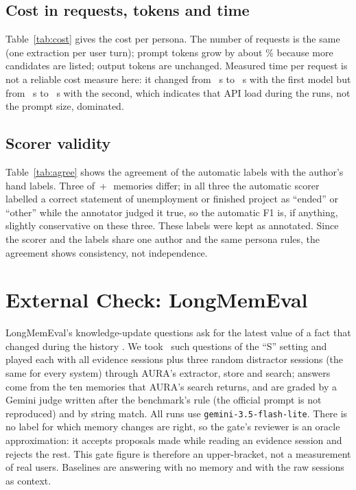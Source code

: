 \IfFileExists{IEEEtran.cls}{\documentclass[journal]{IEEEtran}\def\HAVEIEEE{1}}{\documentclass[10pt,twocolumn]{article}\usepackage[margin=0.7in,columnsep=0.25in]{geometry}}
\newcommand{\aura}{AURA}
\begin{document}
\subsection{Cost in requests, tokens and time}
Table~\ref{tab:cost} gives the cost per persona. The number of requests is the same (one extraction per user turn); prompt tokens grow by about \tokInc\% because more candidates are listed; output tokens are unchanged. Measured time per request is not a reliable cost measure here: it changed from \latBaseA\ s to \latBothA\ s with the first model but from \latBaseB\ s to \latBothB\ s with the second, which indicates that API load during the runs, not the prompt size, dominated.

\begin{table}[t]
\centering\small
\caption{Cost per persona (gate policy; means over 12 personas).}
\label{tab:cost}
\end{table}

\subsection{Scorer validity}
Table~\ref{tab:agree} shows the agreement of the automatic labels with the author's hand labels. Three of \agrBaseN\,+\,\agrBothN\ memories differ; in all three the automatic scorer labelled a correct statement of unemployment or finished project as ``ended'' or ``other'' while the annotator judged it true, so the automatic F1 is, if anything, slightly conservative on these three. These labels were kept as annotated. Since the scorer and the labels share one author and the same persona rules, the agreement shows consistency, not independence.

\begin{table}[t]
\centering\small
\caption{Agreement between automatic and hand labels (single annotator).}
\label{tab:agree}
\end{table}

\section{External Check: LongMemEval}
\label{sec:lme}
LongMemEval's knowledge-update questions ask for the latest value of a fact that changed during the history \cite{wu2024longmemeval}. We took \lmeQ\ such questions of the ``S'' setting and played each with all evidence sessions plus three random distractor sessions (the same for every system) through \aura's extractor, store and search; answers come from the ten memories that \aura's search returns, and are graded by a Gemini judge written after the benchmark's rule (the official prompt is not reproduced) and by string match. All runs use \texttt{gemini-3.5-flash-lite}. There is no label for which memory changes are right, so the gate's reviewer is an oracle approximation: it accepts proposals made while reading an evidence session and rejects the rest. This gate figure is therefore an upper-bracket, not a measurement of real users. Baselines are answering with no memory and with the raw sessions as context.
\end{document}
